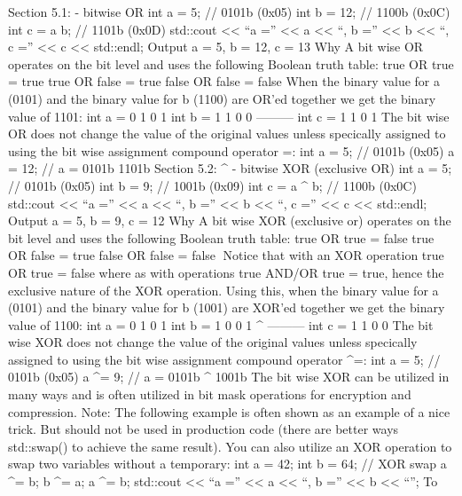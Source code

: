 Section 5.1: \textbar{} - bitwise OR int a = 5; // 0101b (0x05) int b =
12; // 1100b (0x0C) int c = a \textbar{} b; // 1101b (0x0D) std::cout
\textless\textless{} ``a ='' \textless\textless{} a \textless\textless{}
``, b ='' \textless\textless{} b \textless\textless{} ``, c =''
\textless\textless{} c \textless\textless{} std::endl; Output a = 5, b =
12, c = 13 Why A bit wise OR operates on the bit level and uses the
following Boolean truth table: true OR true = true true OR false = true
false OR false = false When the binary value for a (0101) and the binary
value for b (1100) are OR'ed together we get the binary value of 1101:
int a = 0 1 0 1 int b = 1 1 0 0 \textbar{} --------- int c = 1 1 0 1 The
bit wise OR does not change the value of the original values unless
specically assigned to using the bit wise assignment compound operator
\textbar=: int a = 5; // 0101b (0x05) a \textbar= 12; // a = 0101b
\textbar{} 1101b Section 5.2: \^{} - bitwise XOR (exclusive OR) int a =
5; // 0101b (0x05) int b = 9; // 1001b (0x09) int c = a \^{} b; // 1100b
(0x0C) std::cout \textless\textless{} ``a ='' \textless\textless{} a
\textless\textless{} ``, b ='' \textless\textless{} b
\textless\textless{} ``, c ='' \textless\textless{} c
\textless\textless{} std::endl; Output a = 5, b = 9, c = 12 Why A bit
wise XOR (exclusive or) operates on the bit level and uses the following
Boolean truth table: true OR true = false true OR false = true false OR
false = false Notice that with an XOR operation true OR true = false
where as with operations true AND/OR true = true, hence the exclusive
nature of the XOR operation. Using this, when the binary value for a
(0101) and the binary value for b (1001) are XOR'ed together we get the
binary value of 1100: int a = 0 1 0 1 int b = 1 0 0 1 \^{} --------- int
c = 1 1 0 0 The bit wise XOR does not change the value of the original
values unless specically assigned to using the bit wise assignment
compound operator \^{}=: int a = 5; // 0101b (0x05) a \^{}= 9; // a =
0101b \^{} 1001b The bit wise XOR can be utilized in many ways and is
often utilized in bit mask operations for encryption and compression.
Note: The following example is often shown as an example of a nice
trick. But should not be used in production code (there are better ways
std::swap() to achieve the same result). You can also utilize an XOR
operation to swap two variables without a temporary: int a = 42; int b =
64; // XOR swap a \^{}= b; b \^{}= a; a \^{}= b; std::cout
\textless\textless{} ``a ='' \textless\textless{} a \textless\textless{}
``, b ='' \textless\textless{} b \textless\textless{} ``\n''; To
